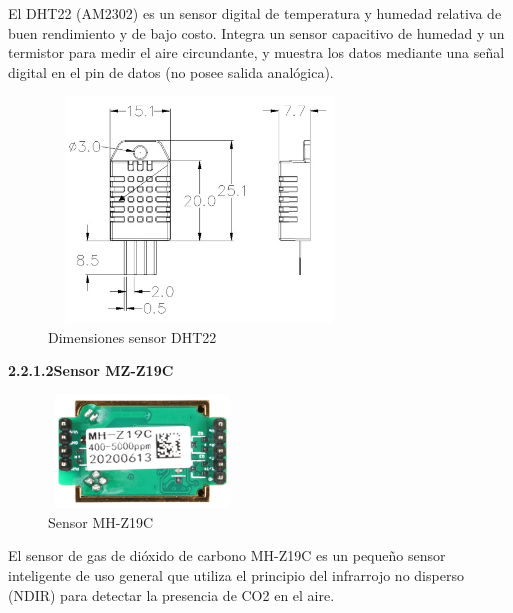 El DHT22 (AM2302) es un sensor digital de temperatura y humedad relativa de buen rendimiento y de bajo costo. Integra un sensor capacitivo de humedad y un termistor para medir el aire circundante, y muestra los datos mediante una señal digital en el pin de datos (no posee salida analógica).\\

\begin{figure}[H]
    \centering
    \includegraphics[width=8cm, height=6cm]{imagenes/dht22 dimensiones.jpg}
    \caption{Dimensiones sensor DHT22}
    \label{imag:dimensiones_dht22}
\end{figure}

\vspace{1cm}

        \textbf{2.2.1.2\hspace{5mm}Sensor MZ-Z19C}

\begin{figure}[H]
      \centering
      \includegraphics[width=5cm, height=3cm]{imagenes/mh-z19c.png}
      \caption{Sensor MH-Z19C}
      \label{imag:mh-z19c}
   \end{figure}

El sensor de gas de dióxido de carbono MH-Z19C es un pequeño sensor inteligente de uso general que utiliza el principio del infrarrojo no disperso (NDIR) para detectar la presencia de CO2 en el aire.\\\\


